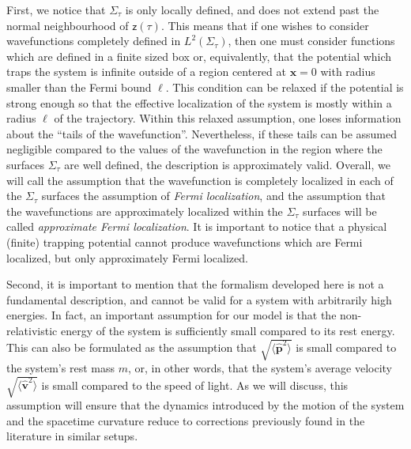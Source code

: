 \documentclass[prd,twocolumn,superscriptaddress,floatfix,amsmath,amssymb,amsfonts,longbibliography,nofootinbib]{revtex4-1}
\newcommand{\mf}{\mathsf}%
\begin{document}
First, we notice that $\Sigma_\tau$ is only locally defined, and does not extend past the normal neighbourhood of $\mf z(\tau)$. This means that if one wishes to consider wavefunctions completely defined in $L^2(\Sigma_\tau)$, then one must consider functions which are defined in a finite sized box or, equivalently, that the potential which traps the system is infinite outside of a region centered at $\bm x = 0$ with radius smaller than the Fermi bound $\ell$. This condition can be relaxed if the potential is strong enough so that the effective localization of the system is mostly within a radius $\ell$ of the trajectory. Within this relaxed assumption, one loses information about the ``tails of the wavefunction''. Nevertheless, if these tails can be assumed negligible compared to the values of the wavefunction in the region where the surfaces $\Sigma_\tau$ are well defined, the description is approximately valid. Overall, we will call the assumption that the wavefunction is completely localized in each of the $\Sigma_\tau$ surfaces the assumption of \emph{Fermi localization}, and the assumption that the wavefunctions are approximately localized within the $\Sigma_\tau$ surfaces will be called \emph{approximate Fermi localization}. It is important to notice that a physical (finite) trapping potential cannot produce wavefunctions which are Fermi localized, but only approximately Fermi localized.

Second, it is important to mention that the formalism developed here is not a fundamental description, and cannot be valid for a system with arbitrarily high energies. In fact, an important assumption for our model is that the non-relativistic energy of the system is sufficiently small compared to its rest energy. This can also be formulated as the assumption that $\sqrt{\langle \hat{\bm p}^2\rangle}$ is small compared to the system's rest mass $m$, or, in other words, that the system's average velocity $\sqrt{\langle\hat{\bm v}^2\rangle}$ is small compared to the speed of light. As we will discuss, this assumption will ensure that the dynamics introduced by the motion of the system and the spacetime curvature reduce to corrections previously found in the literature in similar setups.
\end{document}
